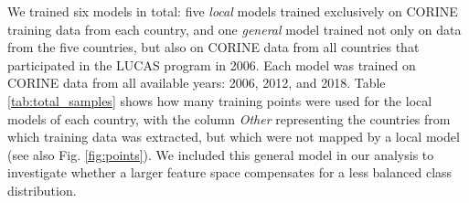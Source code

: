 
        We trained six models in total: five \textit{local} models trained exclusively on CORINE training data from each country, and one \textit{general} model trained not only on data from the five countries, but also on CORINE data from all countries that participated in the LUCAS program in 2006. Each model was trained on CORINE data from all available years: 2006, 2012, and 2018. Table \ref{tab:total_samples} shows how many training points were used for the local models of each country, with the column \textit{Other} representing the countries from which training data was extracted, but which were not mapped by a local model (see also Fig. \ref{fig:points}). We included this general model in our analysis to investigate whether a larger feature space compensates for a less balanced class distribution.
        
